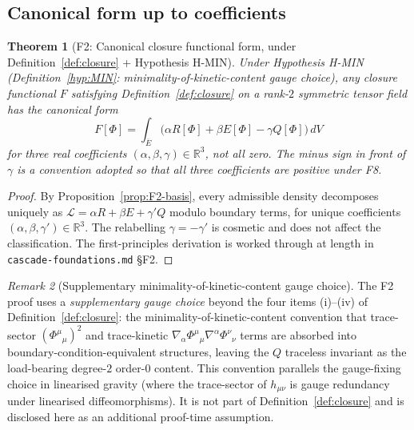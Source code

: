 \documentclass[12pt]{article}
\newtheorem{theorem}{Theorem}
\theoremstyle{definition}
\theoremstyle{remark}
\newtheorem{remark}[theorem]{Remark}
\newcommand{\Lcal}{\mathcal{L}}
\begin{document}
\subsection{Canonical form up to coefficients}

\begin{theorem}[F2: Canonical closure functional form, under Definition~\ref{def:closure} + Hypothesis H-MIN]\label{thm:F2}
Under Hypothesis H-MIN (Definition~\ref{hyp:MIN}: minimality-of-kinetic-content gauge choice), any closure functional $F$ satisfying Definition~\ref{def:closure} on a rank-$2$ symmetric tensor field has the canonical form
\begin{equation}\label{eq:F-form}
F[\Phi] = \int_{\overline{E}} \bigl( \alpha R[\Phi] + \beta E[\Phi] - \gamma Q[\Phi] \bigr) \, dV
\end{equation}
for three real coefficients $(\alpha, \beta, \gamma) \in \mathbb{R}^3$, not all zero. The minus sign in front of $\gamma$ is a convention adopted so that all three coefficients are positive under F8.
\end{theorem}

\begin{proof}
By Proposition~\ref{prop:F2-basis}, every admissible density decomposes uniquely as $\Lcal = \alpha R + \beta E + \gamma' Q$ modulo boundary terms, for unique coefficients $(\alpha, \beta, \gamma') \in \mathbb{R}^3$. The relabelling $\gamma = -\gamma'$ is cosmetic and does not affect the classification. The first-principles derivation is worked through at length in \texttt{cascade-foundations.md} \S F2.
\end{proof}

\begin{remark}[Supplementary minimality-of-kinetic-content gauge choice]\label{rem:F2-gauge-choice}
The F2 proof uses a \emph{supplementary gauge choice} beyond the four items (i)--(iv) of Definition~\ref{def:closure}: the minimality-of-kinetic-content convention that trace-sector $(\Phi^\mu{}_\mu)^2$ and trace-kinetic $\nabla_\alpha \Phi^\mu{}_\mu \nabla^\alpha \Phi^\nu{}_\nu$ terms are absorbed into boundary-condition-equivalent structures, leaving the $Q$ traceless invariant as the load-bearing degree-$2$ order-$0$ content. This convention parallels the gauge-fixing choice in linearised gravity (where the trace-sector of $h_{\mu\nu}$ is gauge redundancy under linearised diffeomorphisms). It is not part of Definition~\ref{def:closure} and is disclosed here as an additional proof-time assumption.
\end{remark}
\end{document}
